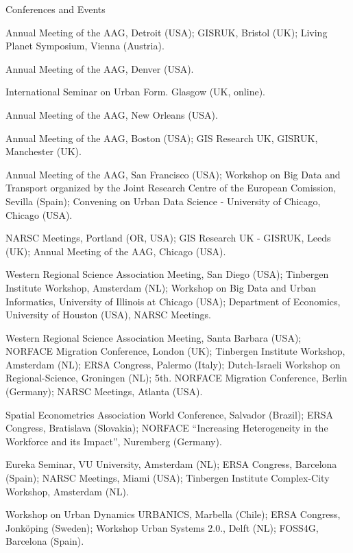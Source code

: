 \documentclass[12pt,2up]{article}
\begin{document}
\begin{cv}{}
\begin{cvlist}{Conferences and Events}
\item[2025] Annual Meeting of the AAG, Detroit (USA); GISRUK, Bristol (UK); Living Planet Symposium,
        Vienna (Austria).
\item[2023] Annual Meeting of the AAG, Denver (USA).
\item[2021] International Seminar on Urban Form. Glasgow (UK, online).
\item[2018] Annual Meeting of the AAG, New Orleans (USA).
\item[2017] Annual Meeting of the AAG, Boston (USA); GIS Research UK, GISRUK,
    Manchester (UK).
\item[2016] Annual Meeting of the AAG, San Francisco (USA); Workshop on Big
    Data and Transport organized by the Joint Research Centre of the European
    Comission, Sevilla (Spain); Convening on Urban
    Data Science - University of Chicago, Chicago (USA).

\item[2015] NARSC Meetings, Portland (OR, USA); 
    GIS Research UK - GISRUK, Leeds (UK); Annual Meeting of the AAG, Chicago (USA).

\item[2014] Western Regional Science Association Meeting, San Diego (USA);
    Tinbergen Institute Workshop, Amsterdam (NL); Workshop on Big Data and
    Urban Informatics, University of Illinois at Chicago (USA); Department of Economics,
    University of Houston (USA), NARSC Meetings.

\item[2013] Western Regional Science Association Meeting, Santa Barbara (USA);
    NORFACE Migration Conference, London (UK);
    Tinbergen Institute Workshop, Amsterdam (NL);
    ERSA Congress, Palermo (Italy);
    Dutch-Israeli Workshop on Regional-Science, Groningen (NL);
    5th. NORFACE Migration Conference, Berlin (Germany);
    NARSC Meetings, Atlanta (USA).

\item[2012] Spatial Econometrics Association World Conference, Salvador
    (Brazil);
    ERSA Congress, Bratislava (Slovakia);
    NORFACE ``Increasing Heterogeneity in the Workforce and its Impact'',
    Nuremberg (Germany).
    
\item[2011] Eureka Seminar, VU University, Amsterdam (NL);
    ERSA Congress, Barcelona (Spain);
    NARSC Meetings, Miami (USA);
    Tinbergen Institute Complex-City Workshop, Amsterdam (NL).

\item[2010] Workshop on Urban Dynamics URBANICS, Marbella (Chile);
    ERSA Congress, Jonk\"{o}ping (Sweden);
    Workshop Urban Systems 2.0., Delft (NL);
    FOSS4G, Barcelona (Spain).


\end{cvlist}
\end{cv}
\end{document}
